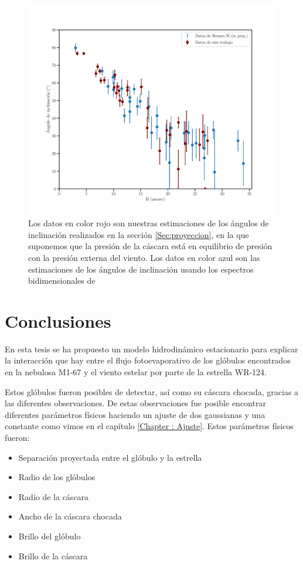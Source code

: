 \documentclass{book}
\begin{document}
\begin{figure}[htb]
    \centering
    \includegraphics[width=\textwidth]{imagenes_corregidas/W.pdf}
    \caption{Los datos en color rojo son nuestras estimaciones de los
      ángulos de inclinación realizados en la sección
      \ref{Sec:proyeccion}, en la que suponemos que la presión de la
      cáscara está en equilibrio de presión con la presión externa del
      viento. Los datos en color azul son las estimaciones de los
      ángulos de inclinación usando los espectros bidimensionales de
      \cite{Zavala:2022}}
    \label{fig:ang_Will}
\end{figure}

\chapter{Conclusiones}

En esta tesis se ha propuesto un modelo hidrodinámico estacionario
para explicar la interacción que hay entre el flujo fotoevaporativo de
los glóbulos encontrados en la nebulosa M1-67 y el viento estelar por
parte de la estrella WR-124.

Estos glóbulos fueron posibles de detectar, así como su cáscara
chocada, gracias a las diferentes observaciones. De estas
observaciones fue posible encontrar diferentes parámetros físicos
haciendo un ajuste de dos gaussianas y una constante como vimos en el
capítulo \ref{Chapter : Ajuste}. Estos parámetros físicos fueron:

\begin{itemize}
    \item Separación proyectada entre el glóbulo y la estrella
    \item Radio de los glóbulos
    \item Radio de la cáscara
    \item Ancho de la cáscara chocada
    \item Brillo del glóbulo
    \item Brillo de la cáscara
\end{itemize}
\end{document}
